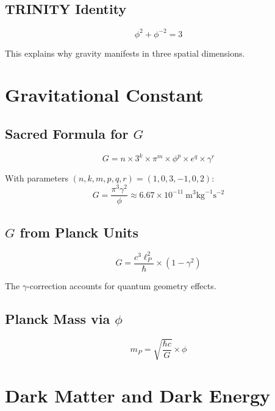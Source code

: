 \documentclass[12pt,a4paper]{article}
\begin{document}
\subsection{TRINITY Identity}

\begin{equation}
\phi^2 + \phi^{-2} = 3
\end{equation}

This explains why gravity manifests in three spatial dimensions.

\section{Gravitational Constant}

\subsection{Sacred Formula for $G$}

\begin{equation}
G = n \times 3^k \times \pi^m \times \phi^p \times e^q \times \gamma^r
\end{equation}

With parameters $(n, k, m, p, q, r) = (1, 0, 3, -1, 0, 2)$:
\begin{equation}
G = \frac{\pi^3 \gamma^2}{\phi} \approx 6.67 \times 10^{-11}~\text{m}^3\text{kg}^{-1}\text{s}^{-2}
\end{equation}

\subsection{$G$ from Planck Units}

\begin{equation}
G = \frac{c^3 \ell_P^2}{\hbar} \times (1 - \gamma^2)
\end{equation}

The $\gamma$-correction accounts for quantum geometry effects.

\subsection{Planck Mass via $\phi$}

\begin{equation}
m_P = \sqrt{\frac{\hbar c}{G}} \times \phi
\end{equation}

\section{Dark Matter and Dark Energy}
\end{document}
